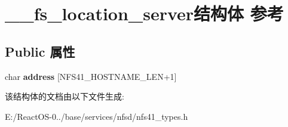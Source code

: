 \hypertarget{struct____fs__location__server}{}\section{\+\_\+\+\_\+fs\+\_\+location\+\_\+server结构体 参考}
\label{struct____fs__location__server}
\subsection*{Public 属性}
\begin{DoxyCompactItemize}
\item 
\mbox{\label{struct____fs__location__server_a4336635f31a363ef6044aeba59a8c64c}} 
char {\bfseries address} \mbox{[}N\+F\+S41\+\_\+\+H\+O\+S\+T\+N\+A\+M\+E\+\_\+\+L\+EN+1\mbox{]}
\end{DoxyCompactItemize}


该结构体的文档由以下文件生成\+:\begin{DoxyCompactItemize}
\item 
E\+:/\+React\+O\+S-\/0../base/services/nfsd/nfs41\+\_\+types.\+h\end{DoxyCompactItemize}
